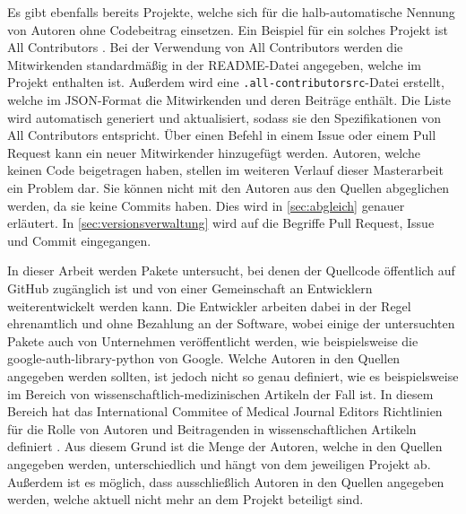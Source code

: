 Es gibt ebenfalls bereits Projekte, welche sich für die halb-automatische Nennung von Autoren ohne Codebeitrag einsetzen.
Ein Beispiel für ein solches Projekt ist \glqq All Contributors\grqq{} \autocite{bolam_recognize_2024}.
Bei der Verwendung von \glqq All Contributors\grqq{} werden die Mitwirkenden standardmäßig in der README-Datei angegeben, welche im Projekt enthalten ist.
Außerdem wird eine \texttt{.all-contributorsrc}-Datei erstellt, welche im JSON-Format die Mitwirkenden und deren Beiträge enthält.
Die Liste wird automatisch generiert und aktualisiert, sodass sie den Spezifikationen von \glqq All Contributors\grqq{} entspricht.
Über einen Befehl in einem Issue oder einem Pull Request kann ein neuer Mitwirkender hinzugefügt werden.
Autoren, welche keinen Code beigetragen haben, stellen im weiteren Verlauf dieser Masterarbeit ein Problem dar.
Sie können nicht mit den Autoren aus den Quellen abgeglichen werden, da sie keine Commits haben.
Dies wird in \autoref{sec:abgleich} genauer erläutert.
In \autoref{sec:versionsverwaltung} wird auf die Begriffe Pull Request, Issue und Commit eingegangen.

In dieser Arbeit werden Pakete untersucht, bei denen der Quellcode öffentlich auf GitHub zugänglich ist und von einer Gemeinschaft an Entwicklern weiterentwickelt werden kann.
Die Entwickler arbeiten dabei in der Regel ehrenamtlich und ohne Bezahlung an der Software, wobei einige der untersuchten Pakete auch von Unternehmen veröffentlicht werden, wie beispielsweise die \glqq google-auth-library-python\grqq{} von Google.
Welche Autoren in den Quellen angegeben werden sollten, ist jedoch nicht so genau definiert, wie es beispielsweise im Bereich von wissenschaftlich-medizinischen Artikeln der Fall ist.
In diesem Bereich hat das \glqq International Commitee of Medical Journal Editors\grqq{} Richtlinien für die Rolle von Autoren und Beitragenden in wissenschaftlichen Artikeln definiert \autocite{icmje_icmje_2024}.
Aus diesem Grund ist die Menge der Autoren, welche in den Quellen angegeben werden, unterschiedlich und hängt von dem jeweiligen Projekt ab.
Außerdem ist es möglich, dass ausschließlich Autoren in den Quellen angegeben werden, welche aktuell nicht mehr an dem Projekt beteiligt sind.
